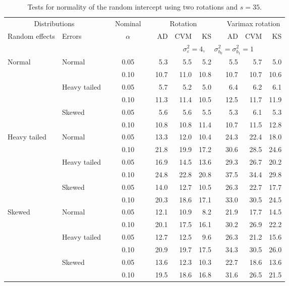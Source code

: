\begin{table}[ht]
\caption{\label{tab:simb0s35-alt}Tests for normality of the random intercept using two rotations and $s = 35$.}
\begin{scriptsize}
\begin{center}
\begin{tabular}{ll p{.1cm} c p{.1cm} rrr p{.1cm} rrr}
  \hline
  \multicolumn{2}{c}{Distributions}& & Nominal & &  \multicolumn{3}{c}{Rotation} & & \multicolumn{3}{c}{Varimax rotation} \\ \cline{1-2} \cline{6-8} \cline{10-12}   
  Random effects & Errors & & $\alpha$ & & AD & CVM & KS & & AD & CVM & KS \\ 
   \hline
& && && \multicolumn{7}{c}{$\sigma_{\varepsilon}^2 = 4$, \ \ $\sigma_{b_0}^2 = \sigma_{b_1}^2 = 1$} \\ \cline{6-12}
Normal       & Normal       && 0.05 &&   5.3 & 5.5 & 5.2 &   & 5.5 & 5.7 & 5.0 \\ 
             &              && 0.10 &&   10.7 & 11.0 & 10.8 &   & 10.7 & 10.7 & 10.6 \\ 
             & Heavy tailed && 0.05 &&   5.7 & 5.2 & 5.0 &   & 6.4 & 6.2 & 6.1 \\ 
             &              && 0.10 &&   11.3 & 11.4 & 10.5 &   & 12.5 & 11.7 & 11.9 \\ 
             & Skewed       && 0.05 &&   5.6 & 5.6 & 5.5 &   & 5.3 & 6.1 & 5.3 \\ 
             &              && 0.10 &&   10.8 & 10.8 & 11.4 &   & 10.7 & 11.5 & 12.8 \\ 
Heavy tailed & Normal       && 0.05 &&   13.3 & 12.0 & 10.4 &   & 24.3 & 22.4 & 18.0 \\ 
             &              && 0.10 &&   21.8 & 19.9 & 17.2 &   & 30.6 & 28.5 & 24.6 \\ 
             & Heavy tailed && 0.05 &&   16.9 & 14.5 & 13.6 &   & 29.3 & 26.7 & 20.2 \\ 
             &              && 0.10 &&   24.8 & 22.8 & 20.8 &   & 37.5 & 34.4 & 29.8 \\ 
             & Skewed       && 0.05 &&   14.0 & 12.7 & 10.5 &   & 26.3 & 22.7 & 17.7 \\ 
             &              && 0.10 &&   20.3 & 18.6 & 17.1 &   & 33.0 & 30.5 & 24.5 \\ 
Skewed       & Normal       && 0.05 &&   12.1 & 10.9 & 8.2 &   & 21.9 & 17.7 & 14.5 \\ 
             &              && 0.10 &&   20.1 & 17.5 & 16.1 &   & 30.2 & 26.9 & 22.2 \\ 
             & Heavy tailed && 0.05 &&   12.7 & 12.5 & 9.6 &   & 26.3 & 21.2 & 15.6 \\ 
             &              && 0.10 &&   20.9 & 19.7 & 17.5 &   & 34.3 & 30.5 & 26.0 \\ 
             & Skewed       && 0.05 &&   13.6 & 12.3 & 10.3 &   & 22.7 & 18.6 & 13.6 \\ 
             &              && 0.10 &&   19.5 & 18.6 & 16.8 &   & 31.6 & 26.5 & 21.5 \\ 


\end{tabular}
\end{center}
\end{scriptsize}
\end{table}
